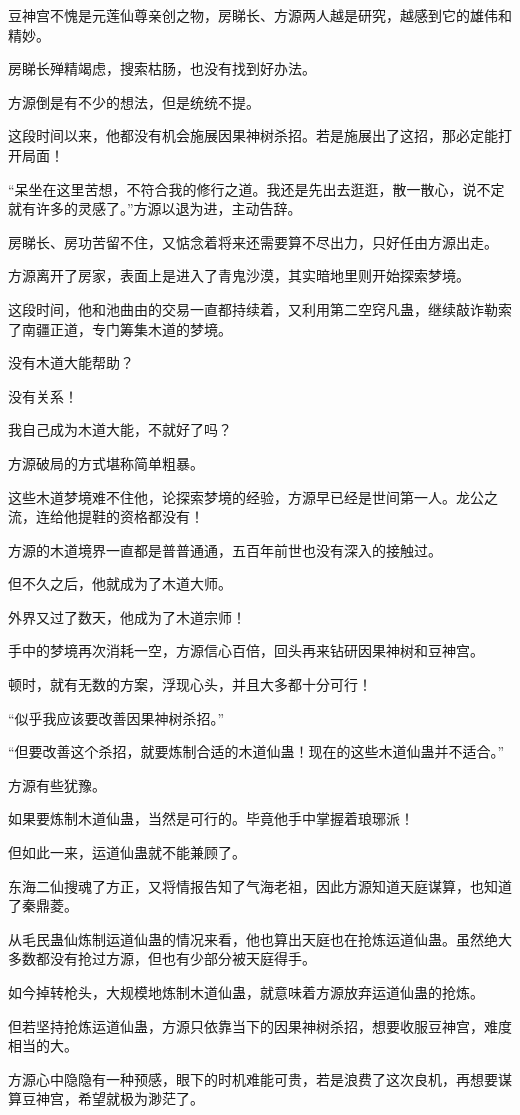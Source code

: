 \begin{this_body}
豆神宫不愧是元莲仙尊亲创之物，房睇长、方源两人越是研究，越感到它的雄伟和精妙。

房睇长殚精竭虑，搜索枯肠，也没有找到好办法。

方源倒是有不少的想法，但是统统不提。

这段时间以来，他都没有机会施展因果神树杀招。若是施展出了这招，那必定能打开局面！

“呆坐在这里苦想，不符合我的修行之道。我还是先出去逛逛，散一散心，说不定就有许多的灵感了。”方源以退为进，主动告辞。

房睇长、房功苦留不住，又惦念着将来还需要算不尽出力，只好任由方源出走。

方源离开了房家，表面上是进入了青鬼沙漠，其实暗地里则开始探索梦境。

这段时间，他和池曲由的交易一直都持续着，又利用第二空窍凡蛊，继续敲诈勒索了南疆正道，专门筹集木道的梦境。

没有木道大能帮助？

没有关系！

我自己成为木道大能，不就好了吗？

方源破局的方式堪称简单粗暴。

这些木道梦境难不住他，论探索梦境的经验，方源早已经是世间第一人。龙公之流，连给他提鞋的资格都没有！

方源的木道境界一直都是普普通通，五百年前世也没有深入的接触过。

但不久之后，他就成为了木道大师。

外界又过了数天，他成为了木道宗师！

手中的梦境再次消耗一空，方源信心百倍，回头再来钻研因果神树和豆神宫。

顿时，就有无数的方案，浮现心头，并且大多都十分可行！

“似乎我应该要改善因果神树杀招。”

“但要改善这个杀招，就要炼制合适的木道仙蛊！现在的这些木道仙蛊并不适合。”

方源有些犹豫。

如果要炼制木道仙蛊，当然是可行的。毕竟他手中掌握着琅琊派！

但如此一来，运道仙蛊就不能兼顾了。

东海二仙搜魂了方正，又将情报告知了气海老祖，因此方源知道天庭谋算，也知道了秦鼎菱。

从毛民蛊仙炼制运道仙蛊的情况来看，他也算出天庭也在抢炼运道仙蛊。虽然绝大多数都没有抢过方源，但也有少部分被天庭得手。

如今掉转枪头，大规模地炼制木道仙蛊，就意味着方源放弃运道仙蛊的抢炼。

但若坚持抢炼运道仙蛊，方源只依靠当下的因果神树杀招，想要收服豆神宫，难度相当的大。

方源心中隐隐有一种预感，眼下的时机难能可贵，若是浪费了这次良机，再想要谋算豆神宫，希望就极为渺茫了。

\end{this_body}

